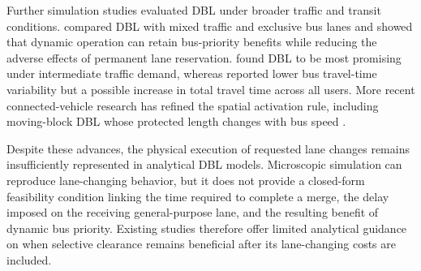 Further simulation studies evaluated DBL under broader traffic and transit conditions. \citet{szarata2021simulation} compared DBL with mixed traffic and exclusive bus lanes and showed that dynamic operation can retain bus-priority benefits while reducing the adverse effects of permanent lane reservation. \citet{othman2023dynamic} found DBL to be most promising under intermediate traffic demand, whereas \citet{olstam2025traffic} reported lower bus travel-time variability but a possible increase in total travel time across all users. More recent connected-vehicle research has refined the spatial activation rule, including moving-block DBL whose protected length changes with bus speed \citep{Luo2023}.

Despite these advances, the physical execution of requested lane changes remains insufficiently represented in analytical DBL models. Microscopic simulation can reproduce lane-changing behavior, but it does not provide a closed-form feasibility condition linking the time required to complete a merge, the delay imposed on the receiving general-purpose lane, and the resulting benefit of dynamic bus priority. Existing studies therefore offer limited analytical guidance on when selective clearance remains beneficial after its lane-changing costs are included.
